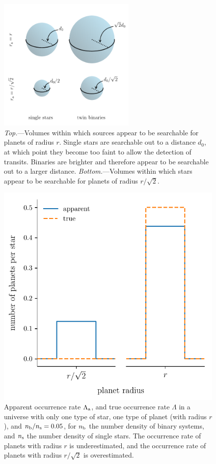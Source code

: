 \documentclass[12pt,modern]{aastex61}
\renewcommand{\a}{_{\rm a}}
\newcommand{\s}{_{\rm s}}
\renewcommand{\b}{_{\rm b}}
\begin{document}
\begin{figure}[!tb]
    \begin{center}
        \includegraphics[width=0.6\textwidth]{figures/f1.pdf}
    \end{center}
    \caption{ {\it Top.}---Volumes within which sources appear to be
    searchable for planets of radius $r$.  Single stars are searchable
    out to a distance $d_0$, at which point they become too faint to
    allow the detection of transits.  Binaries are brighter and
    therefore appear to be searchable out to a larger distance.  {\it
    Bottom.}---Volumes within which stars appear to be searchable for
    planets of radius $r/\sqrt{2}$.  }
    \label{fig:model_1_volumes}
\end{figure}

\begin{figure}[!tb]
    \begin{center}
        \includegraphics[width=.6\textwidth]{figures/f2.pdf}
    \end{center}
    \vspace{-0.5cm}
    \caption{ Apparent occurrence rate $\Lambda\a$, and true
    occurrence rate $\Lambda$ in a universe with only one type of
    star, one type of planet (with radius $r$), and $n\b/n\s=0.05$,
    for $n\b$ the number density of binary systems, and $n\s$ the
    number density of single stars.  The occurrence rate of planets
    with radius $r$ is underestimated, and the occurrence rate of
    planets with radius $r/\sqrt{2}$ is overestimated.}
    \label{fig:occ_rate_model_1}
\end{figure}
\end{document}
